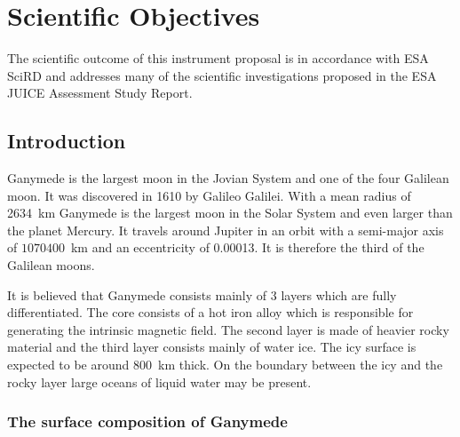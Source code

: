  
\section{Scientific Objectives}
%
The scientific outcome of this instrument proposal is in accordance with ESA \ac{SciRD}\cite{SciRD} and addresses many of the scientific investigations proposed in the ESA JUICE Assessment Study Report\cite{yellowbook}.
%
%

\subsection{Introduction \label{sub:Introduction-science}}

Ganymede is the largest moon in the Jovian System and one of the four
Galilean moon. It was discovered in 1610 by Galileo Galilei. With
a mean radius of 2634~km Ganymede is the largest moon in the Solar
System and even larger than the planet Mercury. It travels around
Jupiter in an orbit with a semi-major axis of $1070400$~km and an
eccentricity of 0.00013. It is therefore the third of the Galilean
moons. 

It is believed that Ganymede consists mainly of 3 layers which are
fully differentiated. The core consists of a hot iron alloy which
is responsible for generating the intrinsic magnetic field. The second
layer is made of heavier rocky material and the third layer consists
mainly of water ice. The icy surface is expected to be around 800~km
thick. On the boundary between the icy and the rocky layer large oceans
of liquid water may be present.


\subsubsection{The surface composition of Ganymede}

